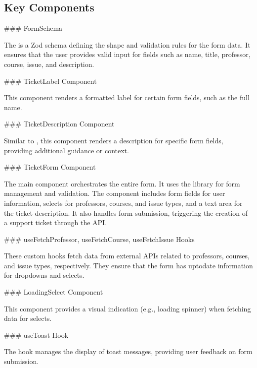 \documentclass[letterpaper,10pt,english]{sphinxmanual}
\begin{document}
\subsection{Key Components}
\label{\detokenize{forms/ticket:key-components}}
\sphinxAtStartPar
\#\#\# FormSchema

\sphinxAtStartPar
The  is a Zod schema defining the shape and validation rules for the form data. It ensures that the user provides valid input for fields such as name, title, professor, course, issue, and description.

\sphinxAtStartPar
\#\#\# TicketLabel Component

\sphinxAtStartPar
This component renders a formatted label for certain form fields, such as the full name.

\sphinxAtStartPar
\#\#\# TicketDescription Component

\sphinxAtStartPar
Similar to , this component renders a description for specific form fields, providing additional guidance or context.

\sphinxAtStartPar
\#\#\# TicketForm Component

\sphinxAtStartPar
The main  component orchestrates the entire form. It uses the  library for form management and validation. The component includes form fields for user information, selects for professors, courses, and issue types, and a text area for the ticket description. It also handles form submission, triggering the creation of a support ticket through the  API.

\sphinxAtStartPar
\#\#\# useFetchProfessor, useFetchCourse, useFetchIssue Hooks

\sphinxAtStartPar
These custom hooks fetch data from external APIs related to professors, courses, and issue types, respectively. They ensure that the form has up\sphinxhyphen{}to\sphinxhyphen{}date information for dropdowns and selects.

\sphinxAtStartPar
\#\#\# LoadingSelect Component

\sphinxAtStartPar
This component provides a visual indication (e.g., loading spinner) when fetching data for selects.

\sphinxAtStartPar
\#\#\# useToast Hook

\sphinxAtStartPar
The  hook manages the display of toast messages, providing user feedback on form submission.
\end{document}
